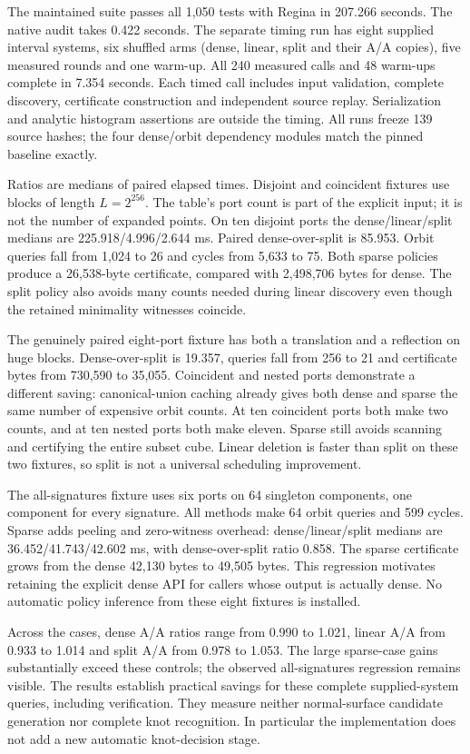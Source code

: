 The maintained suite passes all 1,050 tests with Regina in 207.266 seconds.
The native audit takes 0.422 seconds. The separate timing run has eight
supplied interval systems, six shuffled arms (dense, linear, split and their
A/A copies), five measured rounds and one warm-up. All 240 measured calls
and 48 warm-ups complete in 7.354 seconds. Each timed call includes input
validation, complete discovery, certificate construction and independent
source replay. Serialization and analytic histogram assertions are outside
the timing. All runs freeze 139 source hashes; the four dense/orbit dependency
modules match the pinned baseline exactly.



Ratios are medians of paired elapsed times. Disjoint and coincident fixtures
use blocks of length $L=2^{256}$. The table's port count is part of the explicit
input; it is not the number of expanded points. On ten disjoint ports the
dense/linear/split medians are 225.918/4.996/2.644 ms. Paired dense-over-split
is 85.953. Orbit queries fall from 1,024 to 26 and cycles from 5,633 to 75.
Both sparse policies produce a 26,538-byte certificate, compared with
2,498,706 bytes for dense. The split policy also avoids many counts needed
during linear discovery even though the retained minimality witnesses coincide.

The genuinely paired eight-port fixture has both a translation and a
reflection on huge blocks. Dense-over-split is 19.357, queries fall from 256
to 21 and certificate bytes from 730,590 to 35,055. Coincident and nested
ports demonstrate a different saving: canonical-union caching already gives
both dense and sparse the same number of expensive orbit counts. At ten
coincident ports both make two counts, and at ten nested ports both make
eleven. Sparse still avoids scanning and certifying the entire subset cube.
Linear deletion is faster than split on these two fixtures, so split is not
a universal scheduling improvement.

The all-signatures fixture uses six ports on 64 singleton components, one
component for every signature. All methods make 64 orbit queries and 599
cycles. Sparse adds peeling and zero-witness overhead: dense/linear/split
medians are 36.452/41.743/42.602 ms, with dense-over-split ratio 0.858.
The sparse certificate grows from the dense 42,130 bytes to 49,505 bytes.
This regression motivates retaining the explicit dense API for callers whose
output is actually dense. No automatic policy inference from these eight
fixtures is installed.

Across the cases, dense A/A ratios range from 0.990 to 1.021, linear A/A
from 0.933 to 1.014 and split A/A from 0.978 to 1.053. The large sparse-case
gains substantially exceed these controls; the observed all-signatures
regression remains visible. The results establish practical savings for these
complete supplied-system queries, including verification. They measure neither
normal-surface candidate generation nor complete knot recognition. In
particular the implementation does not add a new automatic knot-decision stage.

